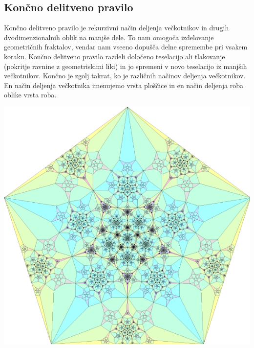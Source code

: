 \documentclass[a4paper, 12px]{article}
\begin{document}
    \subsection{Končno delitveno pravilo}
        Končno delitveno pravilo je rekurzivni način deljenja večkotnikov in drugih dvodimenzionalnih oblik na manjše dele.
        To nam omogoča izdelovanje geometričnih fraktalov, vendar nam vseeno dopušča delne spremembe pri vsakem koraku.
        Končno delitveno pravilo razdeli določeno teselacijo ali tlakovanje (pokritje ravnine z geometriskimi liki) in jo spremeni v novo teselacijo iz manjših večkotnikov.
        Končno je zgolj takrat, ko je različnih načinov deljenja večkotnikov.
        En način deljenja večkotnika imenujemo vrsta ploščice in en način deljenja roba oblike vrsta roba.
        \cite{FSR}
        \centerline{\includegraphics[scale=0.3]{fsr-fractal.png}}
        \begingroup
        \endgroup
\end{document}
